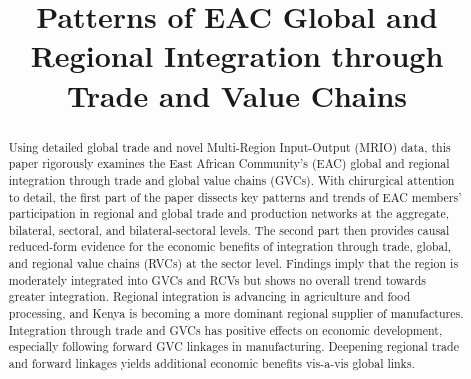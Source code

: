 \documentclass[a4paper]{article}
\title{\textbf{Patterns of EAC Global and Regional Integration through Trade and Value Chains}}
\date{}
\begin{document}
\maketitle


\begin{abstract}
Using detailed global trade and novel Multi-Region Input-Output (MRIO) data, this paper rigorously examines the East African Community's (EAC) global and regional integration through trade and global value chains (GVCs). With chirurgical attention to detail, the first part of the paper dissects key patterns and trends of EAC members' participation in regional and global trade and production networks at the aggregate, bilateral, sectoral, and bilateral-sectoral levels. The second part then provides causal reduced-form evidence for the economic benefits of integration through trade, global, and regional value chains (RVCs) at the sector level. Findings imply that the region is moderately integrated into GVCs and RCVs but shows no overall trend towards greater integration. Regional integration is advancing in agriculture and food processing, and Kenya is becoming a more dominant regional supplier of manufactures. Integration through trade and GVCs has positive effects on economic development, especially following forward GVC linkages in manufacturing. Deepening regional trade and forward linkages yields additional economic benefits vis-a-vis global links. \\


\end{abstract}
\end{document}
